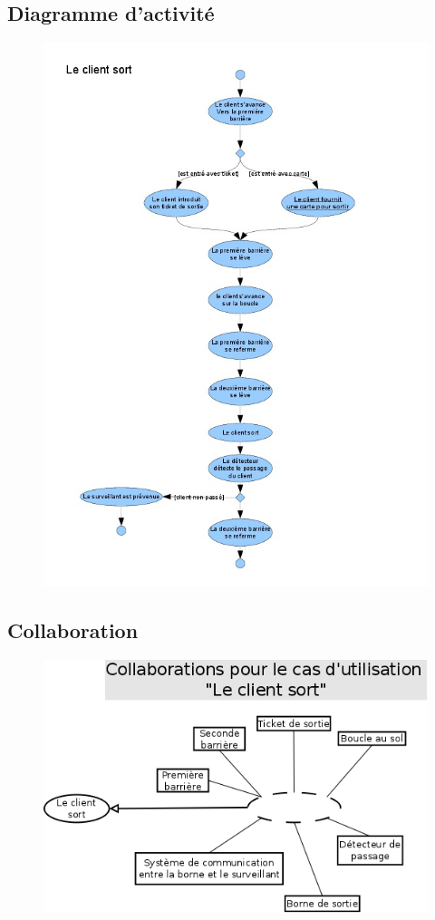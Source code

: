 \documentclass[a4paper]{article}
\begin{document}
\subsection{Diagramme d'activit\'e}
\begin{figure}[!ht]
\centering
\includegraphics[scale=.7]{imgs/act_sort.jpg}
\end{figure}

\subsection{Collaboration}
\begin{figure}[!ht]
\centering
\includegraphics[scale=.5]{collaborations/_sort.png}
\end{figure}
\end{document}
